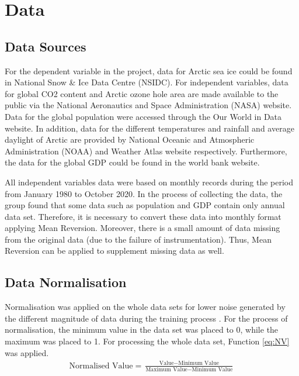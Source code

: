 \section{Data} %
\subsection{Data Sources} %
For the dependent variable in the project, data for Arctic sea ice could be found in National Snow \& Ice Data Centre (NSIDC). For independent variables, data for global CO2 content and Arctic ozone hole area are made available to the public via the National Aeronautics and Space Administration (NASA) website. Data for the global population were accessed through the Our World in Data website. In addition, data for the different temperatures and rainfall and average daylight of Arctic are provided by National Oceanic and Atmospheric Administration (NOAA) and Weather Atlas website respectively. Furthermore, the data for the global GDP could be found in the world bank website.

All independent variables data were based on monthly records during the period from January 1980 to October 2020. In the process of collecting the data, the group found that some data such as population and GDP contain only annual data set. Therefore, it is necessary to convert these data into monthly format applying Mean Reversion. Moreover, there is a small amount of data missing from the original data (due to the failure of instrumentation). Thus, Mean Reversion can be applied to supplement missing data as well.

\subsection{Data Normalisation} %
Normalisation was applied on the whole data sets for lower noise generated by the different magnitude of data during the training process \cite{bessembinder1995mean}. For the process of normalisation, the minimum value in the data set was placed to 0, while the maximum was placed to 1. For processing the whole data set, Function \ref{eq:NV} was applied.
\begin{eqnarray}
    {\text{Normalised Value}} = {\frac {{\text{Value}}-{\text{Minimum Value}} }{{\text{Maximum Value}}-{\text{Minimum Value}}}}
    \label{eq:NV}
\end{eqnarray}